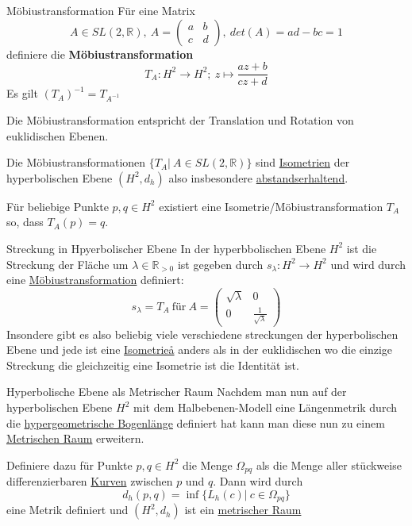 \begin{titleDef}{Möbiustransformation}
\label{moebiustrans}
Für eine Matrix $$A\in SL(2,\mathbb{R}),\: A=\begin{pmatrix}
	a&b\\c&d
\end{pmatrix},\: det(A)=ad-bc=1$$
definiere die \textbf{Möbiustransformation}
$$T_A:H^2\to H^2;\: z\mapsto\frac{az+b}{cz+d}$$
Es gilt $(T_A)^{-1}=T_{A^{-1}}$\par
Die Möbiustransformation entspricht der Translation und Rotation von euklidischen Ebenen.
\par
Die Möbiustransformationen $\{T_A|\ A\in SL(2,\mathbb{R})\}$ sind \hyperref[Isometrie]{Isometrien} der hyperbolischen Ebene $(H^2,d_h)$ also insbesondere \hyperref[abstandserhaltend]{abstandserhaltend}.\par
Für beliebige Punkte $p,q\in H^2$ existiert eine Isometrie/Möbiustransformation $T_A$ so, dass $T_A(p)=q$.
\end{titleDef}

\begin{titleDef}{Streckung in Hpyerbolischer Ebene}
\label{hyperStreckung}
In der hyperbbolischen Ebene $H^2$ ist die Streckung der Fläche um $\lambda\in\mathbb{R}_{>0}$ ist gegeben durch $s_\lambda:H^2\to H^2$ und wird durch eine \hyperref[moebiustrans]{Möbiustransformation} definiert:
$$s_\lambda=T_A \: \text{für} \: A=\begin{pmatrix}
	\sqrt{\lambda}&0\\0&\frac{1}{\sqrt{\lambda}}
\end{pmatrix}$$
Insondere gibt es also beliebig viele verschiedene streckungen der hyperbolischen Ebene und jede ist eine \hyperref[Isometrie]{Isometrieå} anders als in der euklidischen wo die einzige Streckung die gleichzeitig eine Isometrie ist die Identität ist.
\end{titleDef}



\begin{titleDef}{Hyperbolische Ebene als Metrischer Raum}
\label{hyperToMetrisch}
Nachdem man nun auf der hyperbolischen Ebene $H^2$ mit dem Halbebenen-Modell eine Längenmetrik durch die \hyperref[hyperLaenge]{hypergeometrische Bogenlänge} definiert hat kann man diese nun zu einem \hyperref[MetrischerRaum]{Metrischen Raum} erweitern.\par
Definiere dazu für Punkte $p,q\in H^2$ die Menge $\Omega_{pq}$ als die Menge aller stückweise differenzierbaren \hyperref[kurve]{Kurven} zwischen $p$ und $q$. Dann wird durch
$$d_h(p,q)=\inf\{L_h(c)|\ c\in\Omega_{pq}\}$$
eine Metrik definiert und $(H^2,d_h)$ ist ein \hyperref[MetrischerRaum]{metrischer Raum}
\end{titleDef}

